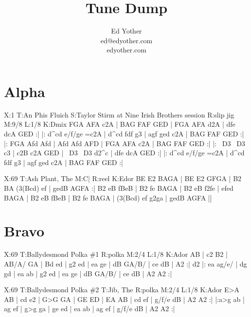 \documentclass[letterpaper]{article}
\title{Tune Dump}
\author{Ed Yother\\ed@edyother.com\\edyother.com}
\begin{document}
\maketitle
	
\tableofcontents

\section{Alpha}
\begin{abc}[name]
X:1
T:An Phis Fluich
S:Taylor Stirm at Nine Irish Brothers session
R:slip jig
M:9/8
L:1/8
K:Dmix
FGA AFA c2A | BAG FAF GED | FGA AFA d2A | dfe dcA GED :|
|: d^cd e/f/ge =c2A | d^cd fdf g3 | agf ged c2A | BAG FAF GED :|
|: FGA Afd Afd | Afd Afd AFD | FGA AFA c2A | BAG FAF GED :|
|: ~D3 ~D3 c3 | c2B c2A GED | ~D3 ~D3 d2^c | dfe dcA GED :|
|: d^cd e/f/ge =c2A | d^cd fdf g3 | agf ged c2A | BAG FAF GED :|
\end{abc}

\begin{abc}[name]
X:69
T:Ash Plant, The
M:C|
R:reel
K:Edor
BE E2 BAGA | BE E2 GFGA | B2 BA (3(Bcd) ef | gedB AGFA :|
B2 eB fBeB | B2 fe BAGA | B2 eB f2fe | efed BAGA |
B2 eB fBeB | B2 fe BAGA | (3(Bcd) ef g2ga | gedB AGFA |]
\end{abc}

\section{Bravo}
\begin{abc}[name]
X:69
T:Ballydesmond Polka \#1
R:polka
M:2/4
L:1/8
K:Ador
AB | c2 B2 | AB/A/ GA | Bd ed | g2 ed |
ea ge | dB GA/B/ | ce dB | A2 :|
d2 |: ea ag/e/ | dg gd | ea ab | g2 ed |
ea ge | dB GA/B/ | ce dB | A2 A2 :|
\end{abc}

\begin{abc}[name]
X:69
T:Ballydesmond Polka \#2
T:Jib, The
R:polka
M:2/4
L:1/8
K:Ador
E>A AB | cd e2 | G>G GA | GE ED |
EA AB | cd ef | g/f/e dB | A2 A2 :|
|:a>g ab | ag ef | g>g ga | ge ed |
ea ab | ag ef | g/f/e dB | A2 A2 :|
\end{abc}
\end{document}
